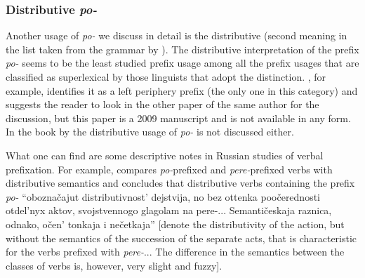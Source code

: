 
\subsubsection{Distributive \textit{po-}}

Another usage of \textit{po-} we discuss in detail is the distributive (second meaning in the list taken from the grammar by \citealt{Shvedova:82}). The distributive interpretation of the prefix \textit{po-} seems to be the least studied prefix usage among all the prefix usages that are classified as superlexical by those linguists that adopt the distinction. \citet{Tatevosov:09}, for example, identifies it as a left periphery prefix (the only one in this category) and suggests the reader to look in the other paper of the same author for the discussion, but this paper is a 2009 manuscript and is not available in any form. In the book by \citet{Kagan:book} the distributive usage of \textit{po-} is not discussed either. 

What one can find are some descriptive notes in Russian studies of verbal prefixation. For example, \citet[289--290]{Isachenko:60} compares \textit{po-}prefixed and \textit{pere-}prefixed verbs with distributive semantics and concludes that distributive verbs containing the prefix \textit{po-} ``obozna\v{c}ajut distributivnost' dejstvija, no bez ottenka poo\v{c}erednosti otdel'nyx aktov, svojstvennogo glagolam na pere-... Semanti\v{c}eskaja raznica, odnako, o\v{c}en' tonkaja i ne\v{c}etkaja'' [denote the distributivity of the action, but without the semantics of the succession of the separate acts, that is characteristic for the verbs prefixed with \textit{pere-}... The difference in the semantics between the classes of verbs is, however, very slight and fuzzy].

